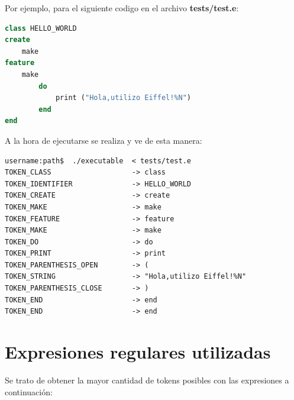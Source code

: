 \documentclass[a4paper,12pt]{article}
\begin{document}
\vspace{4mm}
\noindent
Por ejemplo, para el siguiente codigo en el archivo \textbf{tests/test.e}:

\begin{lstlisting}[language=Eiffel, style=myeiffel]
class HELLO_WORLD
create
    make
feature
    make
        do
            print ("Hola,utilizo Eiffel!%N")
        end
end
\end{lstlisting}

\vspace{4mm}
\noindent
A la hora de ejecutarse se realiza y ve de esta manera:

\begin{lstlisting}[style=DOS]
username:path$  ./executable  < tests/test.e 
TOKEN_CLASS                   -> class
TOKEN_IDENTIFIER              -> HELLO_WORLD
TOKEN_CREATE                  -> create
TOKEN_MAKE                    -> make
TOKEN_FEATURE                 -> feature
TOKEN_MAKE                    -> make
TOKEN_DO                      -> do
TOKEN_PRINT                   -> print
TOKEN_PARENTHESIS_OPEN        -> (
TOKEN_STRING                  -> "Hola,utilizo Eiffel!%N"
TOKEN_PARENTHESIS_CLOSE       -> )
TOKEN_END                     -> end
TOKEN_END                     -> end
\end{lstlisting}

\vspace{6mm}
\section{Expresiones regulares utilizadas}
\vspace{4mm}

Se trato de obtener la mayor cantidad de tokens posibles con las expresiones a
continuación:
\end{document}
